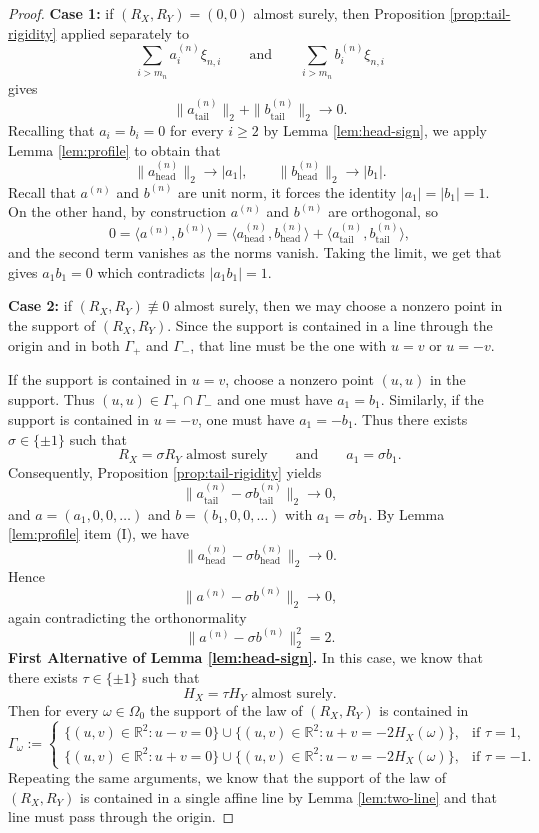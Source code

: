 \documentclass[11pt]{amsart}
\newcommand{\R}{\mathbb R}
\begin{document}
\begin{proof}
\textbf{Case 1:} if $(R_X,R_Y)=(0,0)$ almost surely, then Proposition
\ref{prop:tail-rigidity} applied separately to
\[
\sum_{i > m_n} a_i^{(n)} \xi_{n,i}
\qquad
\text{and}
\qquad
\sum_{i > m_n} b_i^{(n)} \xi_{n,i}
\]
gives
\[
\|a^{(n)}_{\mathrm{tail}}\|_2 + \|b^{(n)}_{\mathrm{tail}}\|_2 \longrightarrow 0.
\]
Recalling that $a_i=b_i=0$ for every $i \ge 2$ by Lemma \ref{lem:head-sign}, we apply Lemma \ref{lem:profile} to obtain that 
\[
\|a^{(n)}_{\mathrm{head}}\|_2 \longrightarrow |a_1|,
\qquad
\|b^{(n)}_{\mathrm{head}}\|_2 \longrightarrow |b_1|.
\]
Recall that  $a^{(n)}$ and $b^{(n)}$ are unit norm, it forces the identity $|a_1|=|b_1|=1$. On the other hand, by construction $a^{(n)}$ and $b^{(n)}$ are orthogonal, so
\[
0
=
\langle a^{(n)},b^{(n)}\rangle
=
\langle a^{(n)}_{\mathrm{head}},b^{(n)}_{\mathrm{head}}\rangle
+
\langle a^{(n)}_{\mathrm{tail}},b^{(n)}_{\mathrm{tail}}\rangle,
\]
and the second term vanishes as the  norms vanish. Taking the limit, we get that gives
$a_1 b_1 = 0$ which contradicts $|a_1b_1|=1$.

\textbf{Case 2:} if $(R_X,R_Y)\not \equiv 0$ almost surely, then we may choose a nonzero point in the support of $(R_X,R_Y)$. Since the
support is contained in a line through the origin and in both $\Gamma_+$ and
$\Gamma_-$, that line must be the one with $u=v$ or $u=-v$.

If the support is contained in $u=v$, choose a nonzero point $(u,u)$ in the
support. Thus $(u,u) \in \Gamma_+ \cap \Gamma_-$ and one must have $a_1=b_1$.
Similarly, if the support is contained in $u=-v$, one must have $a_1=-b_1$. Thus there exists $\sigma \in \{\pm 1\}$ such that
\[
R_X=\sigma R_Y \text{ almost surely}
\qquad
\text{and}
\qquad
a_1=\sigma b_1.
\]
Consequently, Proposition \ref{prop:tail-rigidity} yields
\[
\|a^{(n)}_{\mathrm{tail}} - \sigma b^{(n)}_{\mathrm{tail}}\|_2 \longrightarrow 0,
\]
and $a=(a_1,0,0,\dots)$ and $b=(b_1,0,0,\dots)$ with $a_1=\sigma b_1$. By Lemma \ref{lem:profile} item (I), we have
\[
\|a^{(n)}_{\mathrm{head}} - \sigma b^{(n)}_{\mathrm{head}}\|_2 \longrightarrow 0.
\]
Hence
\[
\|a^{(n)}-\sigma b^{(n)}\|_2 \longrightarrow 0,
\]
again contradicting the orthonormality
\[
\|a^{(n)}-\sigma b^{(n)}\|_2^2 = 2.
\]
\textbf{First Alternative of Lemma \ref{lem:head-sign}.} In this case, we know that there exists
$\tau \in \{\pm 1\}$ such that
\[
H_X=\tau H_Y \text{ almost surely.}
\]
Then for every $\omega \in \Omega_0$ the support of the law of $(R_X,R_Y)$ is
contained in
\[
\Gamma_\omega :=
\begin{cases}
\{(u,v)\in\R^2 : u-v=0\} \cup \{(u,v)\in\R^2 : u+v=-2H_X(\omega)\},
& \text{if $\tau=1$}, \\[2mm]
\{(u,v)\in\R^2 : u+v=0\} \cup \{(u,v)\in\R^2 : u-v=-2H_X(\omega)\},
& \text{if $\tau=-1$}.
\end{cases}
\]
Repeating the same arguments, we know that the support of the law of $(R_X,R_Y)$ is
contained in a single affine line by Lemma \ref{lem:two-line} and that line
must pass through the origin.



\end{proof}
\end{document}
